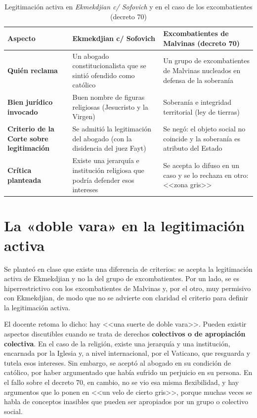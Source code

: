 \documentclass[12pt,oneside]{book}
\begin{document}
\begin{table}[H]
\centering
\caption{Legitimación activa en \textit{Ekmekdjian c/ Sofovich} y en el caso de los excombatientes (decreto 70)}
\small
\begin{tabularx}{\textwidth}{>{\raggedright\arraybackslash}p{}>{\raggedright\arraybackslash}X>{\raggedright\arraybackslash}X}
\toprule
\textbf{Aspecto} & \textbf{Ekmekdjian c/ Sofovich} & \textbf{Excombatientes de Malvinas (decreto 70)} \\
\midrule
\textbf{Quién reclama} & Un abogado constitucionalista que se sintió ofendido como católico & Un grupo de excombatientes de Malvinas nucleados en defensa de la soberanía \\
\addlinespace
\textbf{Bien jurídico invocado} & Buen nombre de figuras religiosas (Jesucristo y la Virgen) & Soberanía e integridad territorial (ley de tierras) \\
\addlinespace
\textbf{Criterio de la Corte sobre legitimación} & Se admitió la legitimación del abogado (con la disidencia del juez Fayt) & Se negó: el objeto social no coincide y la soberanía es atributo del Estado \\
\addlinespace
\textbf{Crítica planteada} & Existe una jerarquía e institución religiosa que podría defender esos intereses & Se acepta lo difuso en un caso y se lo rechaza en otro: <<zona gris>> \\
\bottomrule
\end{tabularx}
\end{table}

\section{La «doble vara» en la legitimación activa}

Se planteó en clase que existe una diferencia de criterios: se acepta la legitimación activa de Ekmekdjian y no la del grupo de excombatientes. Por un lado, se es hiperrestrictivo con los excombatientes de Malvinas y, por el otro, muy permisivo con Ekmekdjian, de modo que no se advierte con claridad el criterio para definir la legitimación activa.

El docente retoma lo dicho: hay <<una suerte de doble vara>>. Pueden existir aspectos discutibles cuando se trata de derechos \textbf{colectivos o de apropiación colectiva}. En el caso de la religión, existe una jerarquía y una institución, encarnada por la Iglesia y, a nivel internacional, por el Vaticano, que resguarda y tutela esos intereses. Sin embargo, se aceptó al abogado en su condición de católico, por haber argumentado que había sufrido un perjuicio en su persona. En el fallo sobre el decreto 70, en cambio, no se vio esa misma flexibilidad, y hay argumentos que lo ponen en <<un velo de cierto gris>>, porque muchas veces se habla de conceptos inasibles que pueden ser apropiados por un grupo o colectivo social.
\end{document}
